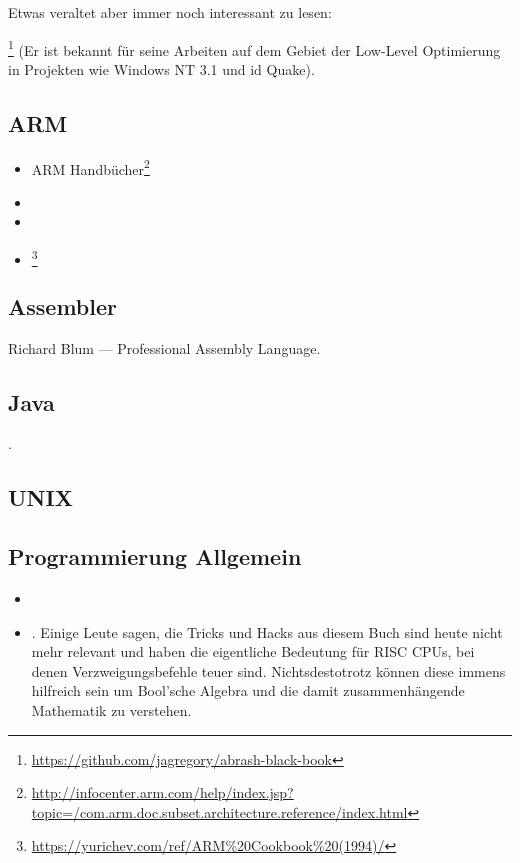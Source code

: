 Etwas veraltet aber immer noch interessant zu lesen:

\MAbrash\footnote{\AlsoAvailableAs \url{https://github.com/jagregory/abrash-black-book}}
(Er ist bekannt für seine Arbeiten auf dem Gebiet der Low-Level Optimierung in Projekten wie Windows NT 3.1 und id Quake).

\subsection{ARM}

\begin{itemize}
\item ARM Handbücher\footnote{\AlsoAvailableAs \url{http://infocenter.arm.com/help/index.jsp?topic=/com.arm.doc.subset.architecture.reference/index.html}}

\item \ARMSevenRef

\item \ARMSixFourRefURL

\item \ARMCookBook\footnote{\AlsoAvailableAs \url{https://yurichev.com/ref/ARM%20Cookbook%20(1994)/}}
\end{itemize}

\subsection{Assembler}

Richard Blum --- Professional Assembly Language.

\subsection{Java}

\JavaBook.

\subsection{UNIX}

\TAOUP

\subsection{Programmierung Allgemein}

\begin{itemize}

	\item \RobPikePractice
	
	\item \HenryWarren.
	Einige Leute sagen, die Tricks und Hacks aus diesem Buch sind heute nicht mehr relevant und haben die eigentliche Bedeutung für \ac{RISC} \ac{CPU}s, bei denen Verzweigungsbefehle teuer sind.
	Nichtsdestotrotz können diese immens hilfreich sein um Bool'sche Algebra und die damit zusammenhängende Mathematik zu verstehen.
	
\end{itemize}



